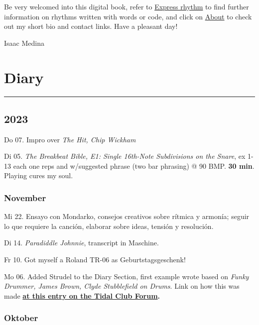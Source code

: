 \documentclass[
]{book}
\begin{document}
Be very welcomed into this digital book, refer to \protect\hyperlink{Express-rhythm}{Express rhythm} to find further information on rhythms written with words or code, and click on \protect\hyperlink{About}{About} to check out my short bio and contact links. Have a pleasant day!

Isaac Medina

\hypertarget{Diary}{%
\chapter{Diary}\label{Diary}}

\begin{center}\rule{0.5\linewidth}{0.5pt}\end{center}

\hypertarget{diary-2023}{%
\section*{2023}\label{diary-2023}}

Do 07. Impro over \emph{The Hit, Chip Wickham}

Di 05. \emph{The Breakbeat Bible, E1: Single 16th-Note Subdivisions on the Snare}, ex 1-13 each one reps and w/suggested phrase (two bar phrasing) @ 90 BMP. \textbf{30 min}. Playing cures my soul.

\hypertarget{november-2023}{%
\subsection*{November}\label{november-2023}}

Mi 22. Ensayo con Mondarko, consejos creativos sobre rítmica y armonía; seguir lo que requiere la canción, elaborar sobre ideas, tensión y resolución.

Di 14. \emph{Paradiddle Johnnie}, transcript in Maschine.

Fr 10. Got myself a Roland TR-06 as Geburtstagsgeschenk!

Mo 06. Added Strudel to the Diary Section, first example wrote based on \emph{Funky Drummer, James Brown, Clyde Stubblefield on Drums}. Link on how this was made \textbf{\href{https://club.tidalcycles.org/t/drum-diary/4931?u=isaacmedina}{at this entry on the Tidal Club Forum}.}

\hypertarget{oktober-2023}{%
\subsection*{Oktober}\label{oktober-2023}}
\end{document}
